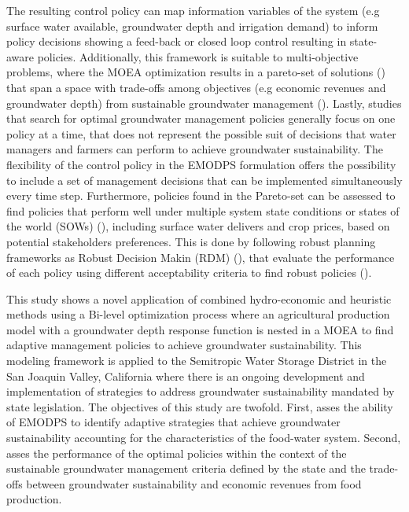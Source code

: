 \documentclass[11pt,a4paper]{article}
\begin{document}
The resulting control policy can map information variables of the system (e.g surface water available, groundwater depth and irrigation demand) to inform policy decisions showing a feed-back or closed loop control resulting in state-aware policies. Additionally, this framework is suitable to multi-objective problems, where the MOEA optimization results in a pareto-set of solutions (\cite{coello_evolutionary_2007}) that span a space with trade-offs among objectives (e.g economic revenues and groundwater depth) from sustainable groundwater management (\cite{greening_design_2004,null_pareto_2021}). Lastly, studies that search for optimal groundwater management policies generally focus on one policy at a time, that does not represent the possible suit of decisions that water managers and farmers can perform to achieve groundwater sustainability. The flexibility of the control policy in the EMODPS formulation offers the possibility to include a set of management decisions that can be implemented simultaneously every time step. Furthermore, policies found in the Pareto-set can be assessed to find policies that perform well under multiple system state conditions or states of the world (SOWs) (\cite{herman_climate_2020}), including surface water delivers and crop prices, based  on potential stakeholders preferences. This is done by following robust planning frameworks as Robust Decision Makin (RDM) (\cite{lempert_making_2013}), that evaluate the performance of each policy using different acceptability criteria to find robust policies (\cite{mcphail_robustness_2018}).

This study shows a novel application of combined hydro-economic and heuristic methods using a Bi-level optimization process where an agricultural production model with a groundwater depth response function is nested in a MOEA to find adaptive management policies to achieve groundwater sustainability. This modeling framework is applied to the Semitropic Water Storage District in the San Joaquin Valley, California where there is an ongoing development and implementation of strategies to address groundwater sustainability mandated by state legislation. The objectives of this study are twofold. First, asses the ability of EMODPS to identify adaptive strategies that achieve groundwater sustainability accounting for the characteristics of the food-water system. Second, asses the performance of the optimal policies within the context of the sustainable groundwater management criteria defined by the state and the trade-offs between groundwater sustainability and economic revenues from food production. 
\end{document}
